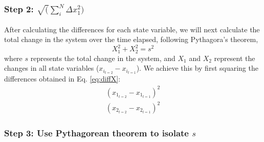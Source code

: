 \documentclass[12pt,twoside,openany]{reedthesis}
\begin{document}
\hypertarget{step-2-sqrtsum_indelta-x_12}{%
\subsubsection{\texorpdfstring{Step 2: \(\sqrt(\sum_i^N\Delta x_1^2)\)}{Step 2: \textbackslash{}sqrt(\textbackslash{}sum\_i\^{}N\textbackslash{}Delta x\_1\^{}2)}}\label{step-2-sqrtsum_indelta-x_12}}

After calculating the differences for each state variable, we will next calculate the total change in the system over the time elapsed, following Pythagora's theorem,
\begin{equation}
 X_1^2 + X_2^2 = s^2 
  \label{eq:pythagorean}
\end{equation}
where \(s\) represents the total change in the system, and \(X_1\) and \(X_2\) represent the changes in all state variables (\(x_{i_{t=2}} - x_{i_{t=1}}\)). We achieve this by first squaring the differences obtained in Eq. \eqref{eq:diffX}:
\begin{equation}
\begin{array}{rcr}
(x_{1_{t=2}} - x_{1_{t=1}})^2  \\
(x_{2_{t=2}} - x_{2_{t=1}})^2 
\end{array}
  \label{eq:diffXsq}
\end{equation}
\hypertarget{step-3-use-pythagorean-theorem-to-isolate-s}{%
\subsubsection{\texorpdfstring{Step 3: Use Pythagorean theorem to isolate \(s\)}{Step 3: Use Pythagorean theorem to isolate s}}\label{step-3-use-pythagorean-theorem-to-isolate-s}}
\end{document}
